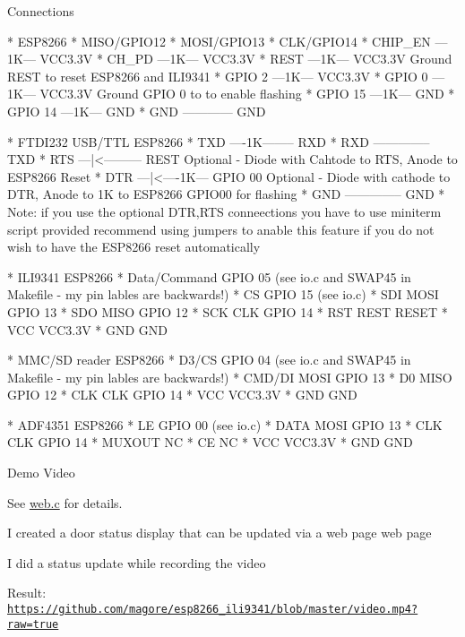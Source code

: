 \begin{DoxyParagraph}{Connections}
\begin{DoxyVerb}* ESP8266           
  * MISO/GPIO12 
  * MOSI/GPIO13
  * CLK/GPIO14
  * CHIP_EN ---1K--- VCC3.3V
  * CH_PD   ---1K--- VCC3.3V
  * REST    ---1K--- VCC3.3V   Ground REST to reset ESP8266 and ILI9341
  * GPIO  2 ---1K--- VCC3.3V
  * GPIO  0 ---1K--- VCC3.3V   Ground GPIO 0 to to enable flashing
  * GPIO 15 ---1K--- GND
  * GPIO 14 ---1K--- GND
  * GND ------------ GND

* FTDI232 USB/TTL      ESP8266
  * TXD ----1K--------  RXD
  * RXD --------------  TXD
  * RTS ---|<--------- REST    Optional - Diode with Cahtode to RTS, Anode to ESP8266 Reset
  * DTR ---|<----1K--- GPIO 00 Optional - Diode with cathode to DTR, Anode to 1K to ESP8266 GPIO00 for flashing
  * GND --------------  GND
  * Note: if you use the optional DTR,RTS conneections you have to use miniterm script provided
  recommend using jumpers to anable this feature if you do not wish to have the ESP8266 reset automatically

* ILI9341        ESP8266
  * Data/Command GPIO 05 (see io.c and SWAP45 in Makefile - my pin lables are backwards!)
  * CS           GPIO 15 (see io.c)
  * SDI    MOSI  GPIO 13
  * SDO    MISO  GPIO 12
  * SCK    CLK   GPIO 14 
  * RST    REST  RESET
  * VCC          VCC3.3V
  * GND          GND

* MMC/SD reader  ESP8266
  * D3/CS        GPIO 04 (see io.c and SWAP45 in Makefile - my pin lables are backwards!)
  * CMD/DI MOSI  GPIO 13
  * D0     MISO  GPIO 12
  * CLK    CLK   GPIO 14
  * VCC          VCC3.3V
  * GND          GND

* ADF4351        ESP8266
  * LE           GPIO 00 (see io.c)
  * DATA   MOSI  GPIO 13
  * CLK     CLK  GPIO 14
  * MUXOUT            NC
  * CE                NC
  * VCC          VCC3.3V
  * GND          GND
\end{DoxyVerb}

\end{DoxyParagraph}
\begin{DoxyParagraph}{Demo Video}

\begin{DoxyItemize}
\item See \hyperlink{web_8c}{web.\+c} for details.
\begin{DoxyItemize}
\item I created a door status display that can be updated via a web page web page
\item I did a status update while recording the video
\item Result\+: \href{https://github.com/magore/esp8266_ili9341/blob/master/video.mp4?raw=true}{\tt https\+://github.\+com/magore/esp8266\+\_\+ili9341/blob/master/video.\+mp4?raw=true}
\end{DoxyItemize}
\end{DoxyItemize}
\end{DoxyParagraph}
